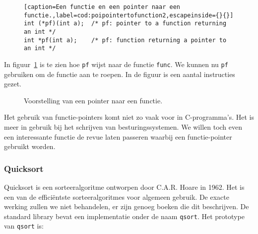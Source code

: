 \begin{figure}[H]
\begin{lstlisting}[caption=Een functie en een pointer naar een functie.,label=cod:poipointertofunction2,escapeinside={}{}]
int (*pf)(int a);  /* pf: pointer to a function returning an int */
int *pf(int a);    /* pf: function returning a pointer to an int */
\end{lstlisting}
\end{figure}

In figuur~\ref{fig:poipointertofunction} is te zien hoe \texttt{pf} wijst naar de functie \texttt{func}. We kunnen nu \texttt{pf} gebruiken om de functie aan te roepen. In de figuur is een aantal instructies gezet.

\begin{figure}[!ht]
\centering
{}
\caption{Voorstelling van een pointer naar een functie.}
\label{fig:poipointertofunction}
\end{figure}

Het gebruik van functie-pointers komt niet zo vaak voor in C-programma's. Het is meer in gebruik bij het schrijven van besturingssystemen. We willen toch even een interessante functie de revue laten passeren waarbij een functie-pointer gebruikt worden.

\subsubsection*{Quicksort}
Quicksort is een sorteeralgoritme ontworpen door C.A.R. Hoare in 1962. Het is een van de efficiëntste sorteeralgoritmes voor algemeen gebruik. De exacte werking zullen we niet behandelen, er zijn genoeg boeken die dit beschrijven. De standard library bevat een implementatie onder de naam \texttt{qsort}. Het prototype van \texttt{qsort} is:


